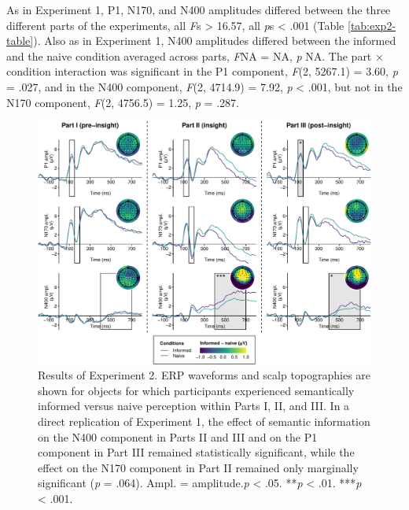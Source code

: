 \documentclass[
  english,
  man,11pt,floatsintext]{apa7}
\begin{document}
As in Experiment 1, P1, N170, and N400 amplitudes differed between the three different parts of the experiments, all \emph{F}s \textgreater{} 16.57, all \emph{p}s \textless{} .001 (Table \ref{tab:exp2-table}). Also as in Experiment 1, N400 amplitudes differed between the informed and the naive condition averaged across parts, \emph{F}NA = NA, \emph{p} NA. The part × condition interaction was significant in the P1 component, \emph{F}(2, 5267.1) = 3.60, \emph{p} = .027, and in the N400 component, \emph{F}(2, 4714.9) = 7.92, \emph{p} \textless{} .001, but not in the N170 component, \emph{F}(2, 4756.5) = 1.25, \emph{p} = .287.



\begin{figure}

{\centering \includegraphics[width=1\linewidth]{manuscript_files/figure-latex/exp2-plot-1} 

}

\caption{Results of Experiment 2. ERP waveforms and scalp topographies are shown for objects for which participants experienced semantically informed versus naive perception within Parts I, II, and III. In a direct replication of Experiment 1, the effect of semantic information on the N400 component in Parts II and III and on the P1 component in Part III remained statistically significant, while the effect on the N170 component in Part II remained only marginally significant (\emph{p} = .064). Ampl. = amplitude.\newline*\emph{p} \textless{} .05. **\emph{p} \textless{} .01. ***\emph{p} \textless{} .001.}\label{fig:exp2-plot}
\end{figure}
\end{document}
